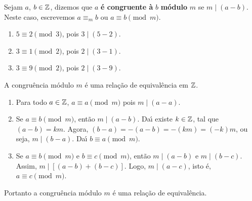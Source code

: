 \begin{definicao}
	Sejam $a$, $b \in\mathbb{Z}$, dizemos que $a$ \textbf{{\'e} congruente à} $b$ \textbf{m{\'o}dulo} $m$ se $m \mid (a-b)$. Neste caso, escrevemos $a\equiv_{m} b$ ou $a\equiv b \pmod{m}$.
\end{definicao}

\begin{exemplos}
	\begin{enumerate}
		\item $5\equiv 2 \pmod{3}$, pois $3 \mid (5-2)$.
		\item $3\equiv 1 \pmod{2}$, pois $2\mid (3-1)$.
		\item $3\equiv 9 \pmod{2}$, pois $2\mid (3-9)$.
	\end{enumerate}	
\end{exemplos}

\begin{proposicao}
	A congru{\^e}ncia m{\'o}dulo $m$ {\'e} uma rela{\c c}{\~a}o de equival{\^e}ncia em $\mathbb{Z}$.
\end{proposicao}
\begin{prova}
	\begin{enumerate}
		\item Para todo $a \in \mathbb{Z}$, $a\equiv a\pmod{m}$ pois $m\mid (a-a)$.
		\item Se $a\equiv b\pmod{m}$, ent{\~a}o $m\mid (a - b)$. Da{\'\i} existe $k \in \mathbb{Z}$, tal que $(a - b) = km$. Agora, $(b - a) = -(a - b) = -(km) = (-k)m$, ou seja, $m \mid (b - a)$. Da{\'\i} $b\equiv a \pmod{m}$.
		\item Se $a\equiv b\pmod{m}$ e $b\equiv c\pmod{m}$, ent{\~a}o $m\mid (a-b)$ e $m\mid (b-c)$. Assim, $m\mid [(a-b)+(b-c)]$. Logo, $m\mid (a-c)$, isto {\'e}, $a\equiv c\pmod{m}$.
	\end{enumerate}

	Portanto a congru{\^e}ncia m{\'o}dulo $m$ {\'e} uma rela{\c c}{\~a}o de equival{\^e}ncia.
\end{prova}

